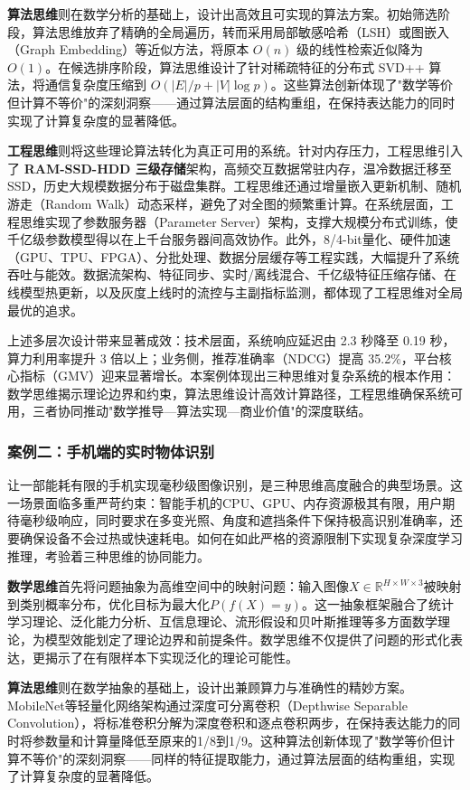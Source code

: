 \textbf{算法思维}则在数学分析的基础上，设计出高效且可实现的算法方案。初始筛选阶段，算法思维放弃了精确的全局遍历，转而采用局部敏感哈希（LSH）或图嵌入（Graph Embedding）等近似方法，将原本 $O(n)$ 级的线性检索近似降为 $O(1)$。在候选排序阶段，算法思维设计了针对稀疏特征的分布式 SVD++ 算法，将通信复杂度压缩到 $O(|E|/p + |V|\log p)$。这些算法创新体现了"数学等价但计算不等价"的深刻洞察——通过算法层面的结构重组，在保持表达能力的同时实现了计算复杂度的显著降低。

\textbf{工程思维}则将这些理论算法转化为真正可用的系统。针对内存压力，工程思维引入了 \textbf{RAM-SSD-HDD 三级存储}架构，高频交互数据常驻内存，温冷数据迁移至 SSD，历史大规模数据分布于磁盘集群。工程思维还通过增量嵌入更新机制、随机游走（Random Walk）动态采样，避免了对全图的频繁重计算。在系统层面，工程思维实现了参数服务器（Parameter Server）架构，支撑大规模分布式训练，使千亿级参数模型得以在上千台服务器间高效协作。此外，8/4-bit量化、硬件加速（GPU、TPU、FPGA）、分批处理、数据分层缓存等工程实践，大幅提升了系统吞吐与能效。数据流架构、特征同步、实时/离线混合、千亿级特征压缩存储、在线模型热更新，以及灰度上线时的流控与主副指标监测，都体现了工程思维对全局最优的追求。

上述多层次设计带来显著成效：技术层面，系统响应延迟由 2.3 秒降至 0.19 秒，算力利用率提升 3 倍以上；业务侧，推荐准确率（NDCG）提高 35.2\%，平台核心指标（GMV）迎来显著增长。本案例体现出三种思维对复杂系统的根本作用：数学思维揭示理论边界和约束，算法思维设计高效计算路径，工程思维确保系统可用，三者协同推动"数学推导—算法实现—商业价值"的深度联结。

\subsubsection{案例二：手机端的实时物体识别}

让一部能耗有限的手机实现毫秒级图像识别，是三种思维高度融合的典型场景。这一场景面临多重严苛约束：智能手机的CPU、GPU、内存资源极其有限，用户期待毫秒级响应，同时要求在多变光照、角度和遮挡条件下保持极高识别准确率，还要确保设备不会过热或快速耗电。如何在如此严格的资源限制下实现复杂深度学习推理，考验着三种思维的协同能力。

\textbf{数学思维}首先将问题抽象为高维空间中的映射问题：输入图像$X\in \mathbb{R}^{H\times W\times 3}$被映射到类别概率分布，优化目标为最大化$P(f(X)=y)$。这一抽象框架融合了统计学习理论、泛化能力分析、互信息理论、流形假设和贝叶斯推理等多方面数学理论，为模型效能划定了理论边界和前提条件。数学思维不仅提供了问题的形式化表达，更揭示了在有限样本下实现泛化的理论可能性。

\textbf{算法思维}则在数学抽象的基础上，设计出兼顾算力与准确性的精妙方案。MobileNet等轻量化网络架构通过深度可分离卷积（Depthwise Separable Convolution），将标准卷积分解为深度卷积和逐点卷积两步，在保持表达能力的同时将参数量和计算量降低至原来的1/8到1/9。这种算法创新体现了"数学等价但计算不等价"的深刻洞察——同样的特征提取能力，通过算法层面的结构重组，实现了计算复杂度的显著降低。

